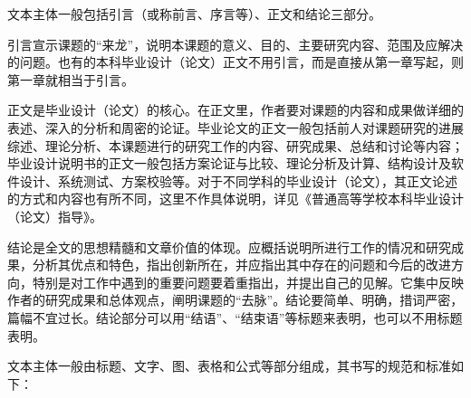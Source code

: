 \documentclass{HDU-Bachelor-Thesis}
\begin{document}
文本主体一般包括引言（或称前言、序言等）、正文和结论三部分。

引言宣示课题的“来龙”，说明本课题的意义、目的、主要研究内容、范围及应解决的问题。也有的本科毕业设计（论文）正文不用引言，而是直接从第一章写起，则第一章就相当于引言。

正文是毕业设计（论文）的核心。在正文里，作者要对课题的内容和成果做详细的表述、深入的分析和周密的论证。毕业论文的正文一般包括前人对课题研究的进展综述、理论分析、本课题进行的研究工作的内容、研究成果、总结和讨论等内容；毕业设计说明书的正文一般包括方案论证与比较、理论分析及计算、结构设计及软件设计、系统测试、方案校验等。对于不同学科的毕业设计（论文），其正文论述的方式和内容也有所不同，这里不作具体说明，详见《普通高等学校本科毕业设计（论文）指导》\cite{putong-wenkejuan,putong-ligongkejuan}。

结论是全文的思想精髓和文章价值的体现。应概括说明所进行工作的情况和研究成果，分析其优点和特色，指出创新所在，并应指出其中存在的问题和今后的改进方向，特别是对工作中遇到的重要问题要着重指出，并提出自己的见解。它集中反映作者的研究成果和总体观点，阐明课题的“去脉”。结论要简单、明确，措词严密，篇幅不宜过长。结论部分可以用“结语”、“结束语”等标题来表明，也可以不用标题表明。

文本主体一般由标题、文字、图、表格和公式等部分组成，其书写的规范和标准如下：
\end{document}
